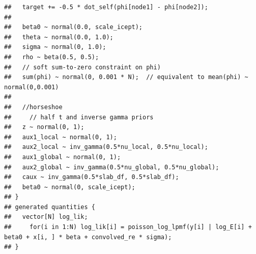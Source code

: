\documentclass[
]{article}
\begin{document}
\begin{verbatim}
##   target += -0.5 * dot_self(phi[node1] - phi[node2]);
## 
##   beta0 ~ normal(0.0, scale_icept);
##   theta ~ normal(0.0, 1.0);
##   sigma ~ normal(0, 1.0);
##   rho ~ beta(0.5, 0.5);
##   // soft sum-to-zero constraint on phi)
##   sum(phi) ~ normal(0, 0.001 * N);  // equivalent to mean(phi) ~ normal(0,0.001)
##   
##   //horseshoe
##     // half t and inverse gamma priors
##   z ~ normal(0, 1);
##   aux1_local ~ normal(0, 1);
##   aux2_local ~ inv_gamma(0.5*nu_local, 0.5*nu_local);
##   aux1_global ~ normal(0, 1);
##   aux2_global ~ inv_gamma(0.5*nu_global, 0.5*nu_global);
##   caux ~ inv_gamma(0.5*slab_df, 0.5*slab_df);
##   beta0 ~ normal(0, scale_icept);
## }
## generated quantities {
##   vector[N] log_lik; 
##     for(i in 1:N) log_lik[i] = poisson_log_lpmf(y[i] | log_E[i] + beta0 + x[i, ] * beta + convolved_re * sigma);
## }
\end{verbatim}
\end{document}
